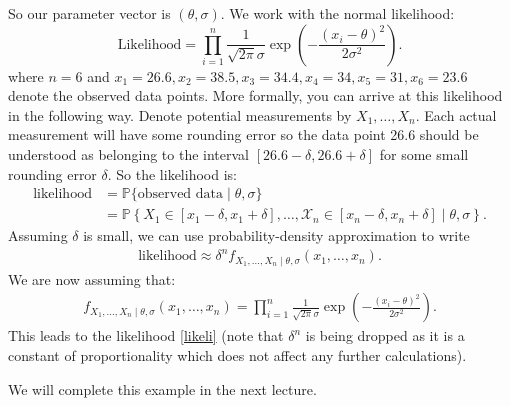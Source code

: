 \documentclass{scrartcl}
\renewcommand{\P}{{\mathbb P}}
\newcommand{\X}{{\mathcal{X}}}
\begin{document}
So our parameter vector is $(\theta, \sigma)$. We work with the normal
likelihood: 
\begin{equation}\label{likeli}
\text{Likelihood} = \prod_{i=1}^n \frac{1}{\sqrt{2 \pi} \sigma} \exp
\left(-\frac{(x_i - 
      \theta)^2}{2 \sigma^2} \right). 
\end{equation}
where $n = 6$ and $x_1 = 26.6, x_2 = 38.5, x_3 = 34.4,
  x_4 = 34, x_5 = 31, x_6 = 23.6$ denote the observed data
  points. More formally, you can arrive at this likelihood in the 
  following way. Denote potential measurements by $X_1, \dots,
  X_n$. Each actual measurement will have some 
  rounding error so the data point 26.6 should be understood as
  belonging to the interval $[26.6 - \delta, 26.6 + \delta]$ for some
  small rounding error $\delta$. So the likelihood is:
  \begin{align*}
    \text{likelihood} &= \P\{\text{observed data} \mid \theta,
                        \sigma\} \\ &= \P \left\{X_1
                                      \in [x_1 - 
                        \delta, x_1 + \delta], \dots, \X_n \in [x_n -
                                      \delta, x_n + 
                                      \delta] \mid \theta, \sigma
                                      \right\}.
  \end{align*}
Assuming $\delta$ is small, we can use probability-density
approximation to write
\begin{align*}
    \text{likelihood} \approx \delta^n  f_{X_1, \dots,
  X_n \mid \theta, \sigma}(x_1, \dots, x_n). 
\end{align*}
We are now assuming that:
\begin{align}\label{baylik}
  f_{X_1, \dots,
  X_n \mid \theta, \sigma}(x_1, \dots, x_n) = \prod_{i=1}^n
  \frac{1}{\sqrt{2 \pi} \sigma} \exp 
\left(-\frac{(x_i - 
      \theta)^2}{2 \sigma^2} \right). 
\end{align}
This leads to the likelihood \eqref{likeli} (note that $\delta^n$ is
being dropped as it is a constant of proportionality which does not
affect any further calculations).

We will complete this example in the next lecture. 

                                  
\end{document}
